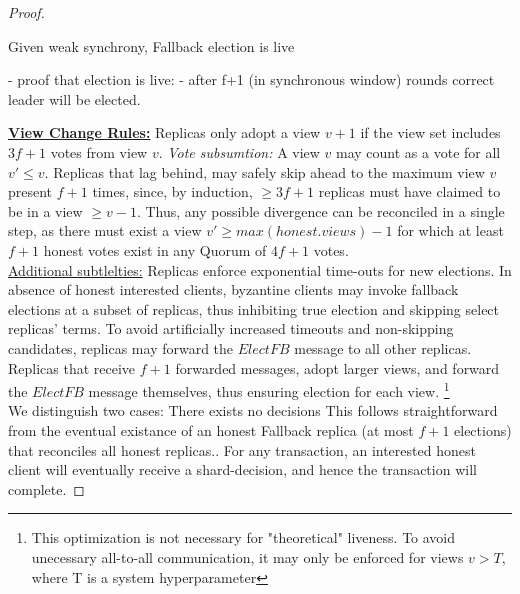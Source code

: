 \begin{proof}
\begin{lemma}
Given weak synchrony, Fallback election is live 
\end{lemma}
- proof that election is live:
- after f+1 (in synchronous window) rounds correct leader will be elected.

\underline{\textbf{View Change Rules:}} \one Replicas only adopt a view $v+1$ if the view set includes $3f+1$ votes from view $v$. \textit{Vote subsumtion:} A view $v$ may count as a vote for all $v' \leq v$. \two Replicas that lag behind, may safely skip ahead to the maximum view $v$ present $f+1$ times, since, by induction, $\geq 3f+1$ replicas must have claimed to be in a view $\geq v-1$. Thus, any possible divergence can be reconciled in a single step, as there must exist a view $v' \geq max(honest.views) -1 $ for which at least $f+1$ honest votes exist in any Quorum of $4f+1$ votes.\\
\underline{Additional subtlelties:} Replicas enforce exponential time-outs for new elections. In absence of honest interested clients, byzantine clients may invoke fallback elections at a subset of replicas, thus inhibiting true election and skipping select replicas' terms. To avoid artificially increased timeouts and non-skipping candidates, replicas may forward the $ElectFB$ message to all other replicas. Replicas that receive $f+1$ forwarded messages, adopt larger views, and forward the $ElectFB$ message themselves, thus ensuring election for each view.
\footnote{This optimization is not necessary for "theoretical" liveness. To avoid unecessary all-to-all communication, it may only be enforced for views $v > T$, where T is a system hyperparameter }\\


We distinguish two cases: \one There exists no decisions 
This follows straightforward from the eventual existance of an honest Fallback replica (at most $f+1$ elections) that reconciles all honest replicas.. For any transaction, an interested honest client will eventually receive a shard-decision, and hence the transaction will complete.
\end{proof}